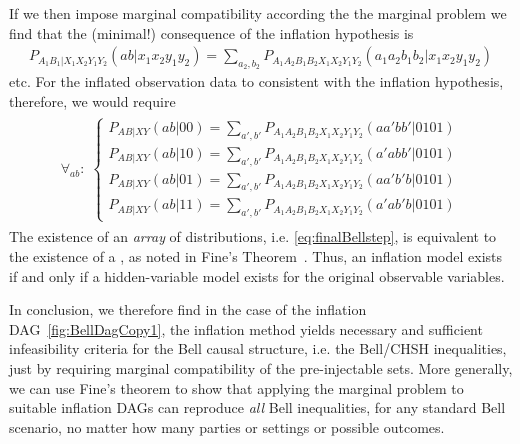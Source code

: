 If we then impose marginal compatibility according the the marginal problem we find that the (minimal!) consequence of the inflation hypothesis is 
\begin{align}
	P_{A_1 B_1 | X_1 X_2 Y_1 Y_2}(a b | x_1 x_2 y_1 y_2)  =  \sum\nolimits_{a_2,b_2} P_{A_1 A_2 B_1 B_2 X_1 X_2 Y_1 Y_2}(a_1 a_2 b_1 b_2|x_1 x_2 y_1 y_2)
\end{align}
etc.
For the inflated observation data to consistent with the inflation hypothesis, therefore, we would require
\begin{align}\begin{split}\label{eq:finalBellstep}\forall_{a b}:\; \begin{cases}
	P_{A B | X Y}(a b | 0 0)  =  \sum\nolimits_{a',b'} P_{A_1 A_2 B_1 B_2 X_1 X_2 Y_1 Y_2}(a a' b b'|0101) \\
	P_{A B | X Y}(a b | 1 0)  =  \sum\nolimits_{a',b'} P_{A_1 A_2 B_1 B_2 X_1 X_2 Y_1 Y_2}(a' a b b'|0101) \\
	P_{A B | X Y}(a b | 0 1)  =  \sum\nolimits_{a',b'} P_{A_1 A_2 B_1 B_2 X_1 X_2 Y_1 Y_2}(a a' b' b|0101) \\
	P_{A B | X Y}(a b | 1 1)  =  \sum\nolimits_{a',b'} P_{A_1 A_2 B_1 B_2 X_1 X_2 Y_1 Y_2}(a' a b' b|0101)
\end{cases}\end{split}\end{align}
The existence of an \emph{array} of distributions, i.e. \cref{eq:finalBellstep}, is equivalent to the existence of a , as noted in Fine's Theorem~\cite{FineTheorem}. Thus, an inflation model exists if and only if a hidden-variable model exists for the original observable variables.


In conclusion, we therefore find in the case of the inflation DAG~\cref{fig:BellDagCopy1}, the inflation method yields necessary and sufficient infeasibility criteria for the Bell causal structure, i.e. the Bell/CHSH inequalities, just by requiring marginal compatibility of the pre-injectable sets.
More generally, we can use Fine's theorem to show that applying the marginal problem to suitable inflation DAGs can reproduce \emph{all} Bell inequalities, for any standard Bell scenario, no matter how many parties or settings or possible outcomes. 

